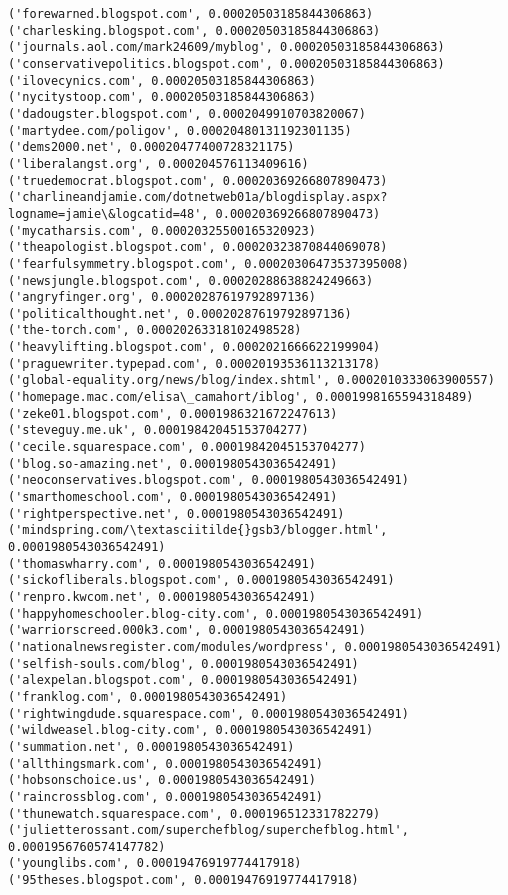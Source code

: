 \documentclass[11pt]{article}
\begin{document}
\begin{Verbatim}[commandchars=\\\{\}]
('forewarned.blogspot.com', 0.00020503185844306863)
('charlesking.blogspot.com', 0.00020503185844306863)
('journals.aol.com/mark24609/myblog', 0.00020503185844306863)
('conservativepolitics.blogspot.com', 0.00020503185844306863)
('ilovecynics.com', 0.00020503185844306863)
('nycitystoop.com', 0.00020503185844306863)
('dadougster.blogspot.com', 0.0002049910703820067)
('martydee.com/poligov', 0.00020480131192301135)
('dems2000.net', 0.00020477400728321175)
('liberalangst.org', 0.000204576113409616)
('truedemocrat.blogspot.com', 0.00020369266807890473)
('charlineandjamie.com/dotnetweb01a/blogdisplay.aspx?logname=jamie\&logcatid=48', 0.00020369266807890473)
('mycatharsis.com', 0.00020325500165320923)
('theapologist.blogspot.com', 0.00020323870844069078)
('fearfulsymmetry.blogspot.com', 0.00020306473537395008)
('newsjungle.blogspot.com', 0.00020288638824249663)
('angryfinger.org', 0.00020287619792897136)
('politicalthought.net', 0.00020287619792897136)
('the-torch.com', 0.00020263318102498528)
('heavylifting.blogspot.com', 0.0002021666622199904)
('praguewriter.typepad.com', 0.00020193536113213178)
('global-equality.org/news/blog/index.shtml', 0.0002010333063900557)
('homepage.mac.com/elisa\_camahort/iblog', 0.0001998165594318489)
('zeke01.blogspot.com', 0.0001986321672247613)
('steveguy.me.uk', 0.00019842045153704277)
('cecile.squarespace.com', 0.00019842045153704277)
('blog.so-amazing.net', 0.0001980543036542491)
('neoconservatives.blogspot.com', 0.0001980543036542491)
('smarthomeschool.com', 0.0001980543036542491)
('rightperspective.net', 0.0001980543036542491)
('mindspring.com/\textasciitilde{}gsb3/blogger.html', 0.0001980543036542491)
('thomaswharry.com', 0.0001980543036542491)
('sickofliberals.blogspot.com', 0.0001980543036542491)
('renpro.kwcom.net', 0.0001980543036542491)
('happyhomeschooler.blog-city.com', 0.0001980543036542491)
('warriorscreed.000k3.com', 0.0001980543036542491)
('nationalnewsregister.com/modules/wordpress', 0.0001980543036542491)
('selfish-souls.com/blog', 0.0001980543036542491)
('alexpelan.blogspot.com', 0.0001980543036542491)
('franklog.com', 0.0001980543036542491)
('rightwingdude.squarespace.com', 0.0001980543036542491)
('wildweasel.blog-city.com', 0.0001980543036542491)
('summation.net', 0.0001980543036542491)
('allthingsmark.com', 0.0001980543036542491)
('hobsonschoice.us', 0.0001980543036542491)
('raincrossblog.com', 0.0001980543036542491)
('thunewatch.squarespace.com', 0.000196512331782279)
('julietterossant.com/superchefblog/superchefblog.html', 0.0001956760574147782)
('younglibs.com', 0.00019476919774417918)
('95theses.blogspot.com', 0.00019476919774417918)

\end{Verbatim}
\end{document}
